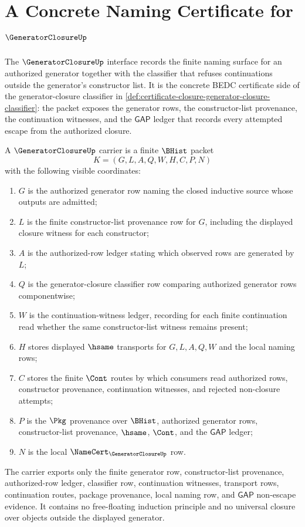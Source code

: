 \chapter{A Concrete Naming Certificate for $\GeneratorClosureUp$}
\label{ch:concrete-instances-generatorclosure-namecert}

The $\GeneratorClosureUp$ interface records the finite naming surface for an authorized generator together with the classifier that refuses continuations outside the generator's constructor list. It is the concrete BEDC certificate side of the generator-closure classifier in \autoref{def:certificate-closure-generator-closure-classifier}: the packet exposes the generator rows, the constructor-list provenance, the continuation witnesses, and the $\mathsf{GAP}$ ledger that records every attempted escape from the authorized closure.

\begin{definition}
\label{def:generator-closure-namecert-carrier}
A $\GeneratorClosureUp$ carrier is a finite $\BHist$ packet
$$
K=(G,L,A,Q,W,H,C,P,N)
$$
with the following visible coordinates:
\begin{enumerate}
\item $G$ is the authorized generator row naming the closed inductive source whose outputs are admitted;
\item $L$ is the finite constructor-list provenance row for $G$, including the displayed closure witness for each constructor;
\item $A$ is the authorized-row ledger stating which observed rows are generated by $L$;
\item $Q$ is the generator-closure classifier row comparing authorized generator rows componentwise;
\item $W$ is the continuation-witness ledger, recording for each finite continuation read whether the same constructor-list witness remains present;
\item $H$ stores displayed $\hsame$ transports for $G,L,A,Q,W$ and the local naming rows;
\item $C$ stores the finite $\Cont$ routes by which consumers read authorized rows, constructor provenance, continuation witnesses, and rejected non-closure attempts;
\item $P$ is the $\Pkg$ provenance over $\BHist$, authorized generator rows, constructor-list provenance, $\hsame$, $\Cont$, and the $\mathsf{GAP}$ ledger;
\item $N$ is the local $\NameCert_{\GeneratorClosureUp}$ row.
\end{enumerate}
The carrier exports only the finite generator row, constructor-list provenance, authorized-row ledger, classifier row, continuation witnesses, transport rows, continuation routes, package provenance, local naming row, and $\mathsf{GAP}$ non-escape evidence. It contains no free-floating induction principle and no universal closure over objects outside the displayed generator.
\end{definition}

